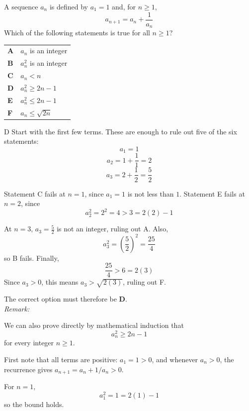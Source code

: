 \documentclass[11pt,a4paper]{article}
\begin{document}
\begin{enumerate}[label=\textbf{\arabic*.},leftmargin=*,itemsep=0pt,start=11]
A sequence $a_n$ is defined by $a_1=1$ and, for $n\ge 1$, \[ a_{n+1}=a_n+\dfrac{1}{a_n} \] Which of the following statements is true for all $n\ge 1$?

\par\vspace*{12pt}
\begin{tabularx}{\linewidth}{@{}>{\bfseries}l Y@{}}
A &
$a_n$ is an integer
\\[0.8em]
B &
$a_n^2$ is an integer
\\[0.8em]
C &
$a_n<n$
\\[0.8em]
D &
$a_n^2 \ge 2n-1$
\\[0.8em]
E &
$a_n^2 \le 2n-1$
\\[0.8em]
F &
$a_n \le \sqrt{2n}$
\\
\end{tabularx}

\begin{djsSolution}{D}
Start with the first few terms. These are enough to rule out five of the six statements:
\[
a_1=1
\]
\[
a_2=1+\frac{1}{1}=2
\]
\[
a_3=2+\frac{1}{2}=\frac52
\]

Statement C fails at $n=1$, since $a_1=1$ is not less than $1$. Statement E fails at $n=2$, since
\[
a_2^2=2^2=4>3=2(2)-1
\]

At $n=3$, $a_3=\frac52$ is not an integer, ruling out A. Also,
\[
a_3^2=\left(\frac52\right)^2=\frac{25}{4}
\]
so B fails. Finally,
\[
\frac{25}{4}>6=2(3)
\]
Since $a_3>0$, this means $a_3>\sqrt{2(3)}$, ruling out F.

The correct option must therefore be \textbf{D}.\\[5pt]

\textit{Remark:}

We can also prove directly by mathematical induction that
\[
a_n^2\geq2n-1
\]
for every integer $n\geq1$.

First note that all terms are positive: $a_1=1>0$, and whenever $a_n>0$, the recurrence gives $a_{n+1}=a_n+1/a_n>0$.

For $n=1$,
\[
a_1^2=1=2(1)-1
\]
so the bound holds.


\end{djsSolution}
\end{enumerate}
\end{document}
